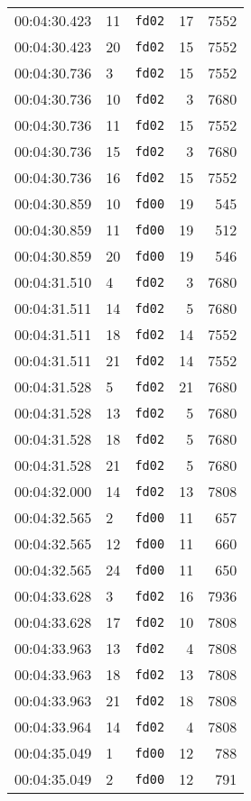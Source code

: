 \documentclass{article}
\begin{document}
\begin{longtable}{lllrr}
00:04:30.423 & 11 & \texttt{fd02} & 17 & 7552 \\
00:04:30.423 & 20 & \texttt{fd02} & 15 & 7552 \\
00:04:30.736 & 3 & \texttt{fd02} & 15 & 7552 \\
00:04:30.736 & 10 & \texttt{fd02} & 3 & 7680 \\
00:04:30.736 & 11 & \texttt{fd02} & 15 & 7552 \\
00:04:30.736 & 15 & \texttt{fd02} & 3 & 7680 \\
00:04:30.736 & 16 & \texttt{fd02} & 15 & 7552 \\
00:04:30.859 & 10 & \texttt{fd00} & 19 & 545 \\
00:04:30.859 & 11 & \texttt{fd00} & 19 & 512 \\
00:04:30.859 & 20 & \texttt{fd00} & 19 & 546 \\
00:04:31.510 & 4 & \texttt{fd02} & 3 & 7680 \\
00:04:31.511 & 14 & \texttt{fd02} & 5 & 7680 \\
00:04:31.511 & 18 & \texttt{fd02} & 14 & 7552 \\
00:04:31.511 & 21 & \texttt{fd02} & 14 & 7552 \\
00:04:31.528 & 5 & \texttt{fd02} & 21 & 7680 \\
00:04:31.528 & 13 & \texttt{fd02} & 5 & 7680 \\
00:04:31.528 & 18 & \texttt{fd02} & 5 & 7680 \\
00:04:31.528 & 21 & \texttt{fd02} & 5 & 7680 \\
00:04:32.000 & 14 & \texttt{fd02} & 13 & 7808 \\
00:04:32.565 & 2 & \texttt{fd00} & 11 & 657 \\
00:04:32.565 & 12 & \texttt{fd00} & 11 & 660 \\
00:04:32.565 & 24 & \texttt{fd00} & 11 & 650 \\
00:04:33.628 & 3 & \texttt{fd02} & 16 & 7936 \\
00:04:33.628 & 17 & \texttt{fd02} & 10 & 7808 \\
00:04:33.963 & 13 & \texttt{fd02} & 4 & 7808 \\
00:04:33.963 & 18 & \texttt{fd02} & 13 & 7808 \\
00:04:33.963 & 21 & \texttt{fd02} & 18 & 7808 \\
00:04:33.964 & 14 & \texttt{fd02} & 4 & 7808 \\
00:04:35.049 & 1 & \texttt{fd00} & 12 & 788 \\
00:04:35.049 & 2 & \texttt{fd00} & 12 & 791 \\

\end{longtable}
\end{document}
